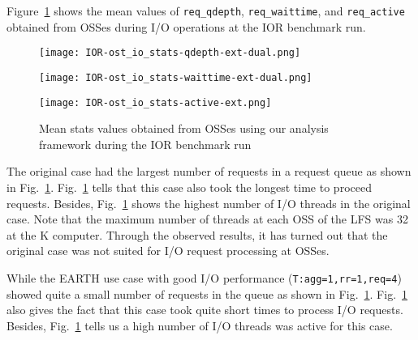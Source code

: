 \documentclass{jhps}
\begin{document}
Figure~\ref{fig:IOR_OST_IO_STATS} shows the mean values of
{\tt req\_qdepth}, {\tt req\_waittime}, and {\tt req\_active} obtained from OSSes
during I/O operations at the IOR benchmark run.
%
\begin{figure}[htb]
\centering
\begin{minipage}[t]{0.88\textwidth}
 \centering
 \texttt{[image: IOR-ost\_io\_stats-qdepth-ext-dual.png]}
 \label{fig:IOR_req_qdepth}
\end{minipage}
%
\noindent
\begin{minipage}[t]{0.88\textwidth}
 \centering
 \texttt{[image: IOR-ost\_io\_stats-waittime-ext-dual.png]}
 \label{fig:IOR_req_waittime}
\end{minipage}
%
\noindent
\begin{minipage}[t]{0.4\textwidth}
 \centering
 \texttt{[image: IOR-ost\_io\_stats-active-ext.png]}
 \label{fig:IOR_req_active}
\end{minipage}
%
\caption{Mean stats values obtained from OSSes using our analysis framework
during the IOR benchmark run}
\label{fig:IOR_OST_IO_STATS}
\end{figure}
%
The original case had the largest number of requests in a request queue
as shown in Fig.~\ref{fig:IOR_OST_IO_STATS}.
Fig.~\ref{fig:IOR_OST_IO_STATS}
tells that this case also took the longest time to proceed requests.
Besides, Fig.~\ref{fig:IOR_OST_IO_STATS} shows
the highest number of I/O threads in the original case.
Note that the maximum number of threads at each OSS of the LFS was 32
at the K computer.
Through the observed results, it has turned out that the original case was not
suited for I/O request processing at OSSes.

While the EARTH use case with good I/O performance ({\tt T:agg=1,rr=1,req=4})
showed quite a small number of requests in the queue as shown in
Fig.~\ref{fig:IOR_OST_IO_STATS}.
Fig.~\ref{fig:IOR_OST_IO_STATS} also gives
the fact that this case took quite short times to process I/O requests.
Besides, Fig.~\ref{fig:IOR_OST_IO_STATS}
tells us a high number of I/O threads was active for this case.
\end{document}
